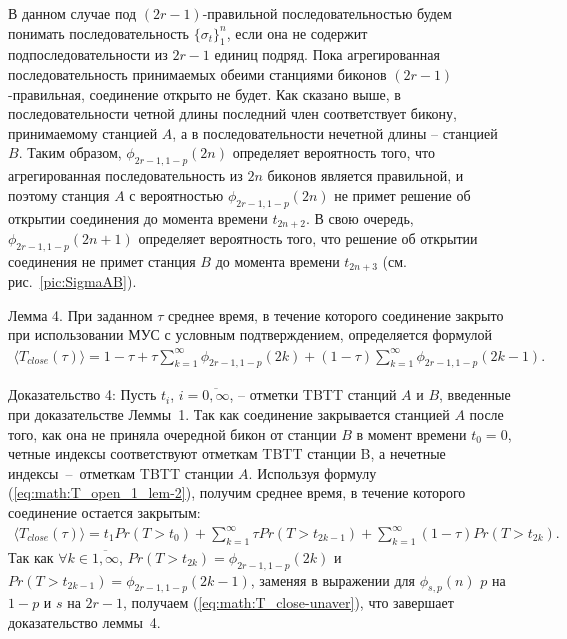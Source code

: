 В данном случае под $(2r-1)$-правильной последовательностью будем понимать последовательность $\{\sigma_t\}_1^n$, если она не содержит подпоследовательности из $2r-1$ единиц подряд. Пока агрегированная последовательность принимаемых обеими станциями биконов $(2r-1)$-правильная, соединение открыто не будет. Как сказано выше, в последовательности четной длины последний член соответствует бикону, принимаемому станцией $A$, а в последовательности нечетной длины -- станцией $B$. Таким образом, $\phi_{2r-1,1-p}(2n)$ определяет вероятность того, что агрегированная последовательность из $2n$ биконов является правильной, и поэтому станция $A$ с вероятностью $\phi_{2r-1,1-p}(2n)$ не примет решение об открытии соединения до момента времени $t_{2n+2}$. В свою очередь, $\phi_{2r-1,1-p}(2n+1)$ определяет вероятность того, что решение об открытии соединения не примет станция $B$ до момента времени $t_{2n+3}$ (см. рис.~\ref{pic:SigmaAB}).

Лемма 4. \label{lm:3}
При заданном  $\tau$ среднее время, в течение которого соединение закрыто при использовании МУС с условным подтверждением, определяется формулой
\begin{equation}
\begin{array}{c}
\label{eq:math:T_close-unaver}
\langle T_{close}(\tau) \rangle = 1-\tau + \tau \sum \limits_{k=1}^{\infty}  \phi_{2r-1,1-p}(2k) + (1-\tau)\sum \limits_{k=1}^{\infty} \phi_{2r-1,1-p}(2k-1).
\end{array}
\end{equation}

Доказательство 4:
Пусть $t_i$, $ i = \overline{0,\infty}$, -- отметки TBTT станций $A$ и $B$, введенные при доказательстве Леммы~1. Так как соединение закрывается станцией $A$ после того, как она не приняла очередной бикон от станции $B$ в момент времени $t_0=0$, четные индексы соответствуют отметкам TBTT станции B, а нечетные индексы~--~отметкам TBTT станции $A$. Используя формулу (\ref{eq:math:T_open_1_lem-2}), получим среднее время, в течение которого соединение остается закрытым:
\[
\begin{array}{c}
\langle T_{close}(\tau) \rangle
= t_1 Pr(T > t_0) + \sum \limits_{k=1}^{\infty} \tau Pr(T>t_{2k-1}) + \sum \limits_{k=1}^{\infty} (1-\tau)Pr(T>t_{2k}).
\end{array}
\]
Так как $\forall k \in \overline{1,\infty}$,  $Pr(T>t_{2k}) = \phi_{2r-1,1-p}(2k)$ и $Pr(T>t_{2k-1}) = \phi_{2r-1,1-p}(2k-1)$, заменяя в выражении для $\phi_{s,p}(n)$ $p$ на $1-p$ и $s$ на  $2r-1$, получаем (\ref{eq:math:T_close-unaver}), что завершает доказательство леммы~4.

